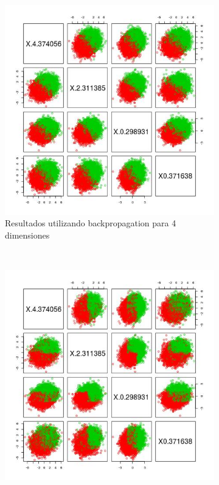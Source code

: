 \documentclass[12pt, a4paper]{article}
\begin{document}
\begin{figure}
    \centering

~ %
    \begin{subfigure}[b]{0.45\textwidth}
        \includegraphics[width=\textwidth]{prediccionA4}
        \caption{Resultados utilizando backpropagation para 4 dimensiones}  
    \end{subfigure}
      ~ %
    \begin{subfigure}[b]{0.45\textwidth}
        \includegraphics[width=\textwidth]{prediccionA4tree}

\end{subfigure}
\end{figure}
\end{document}
